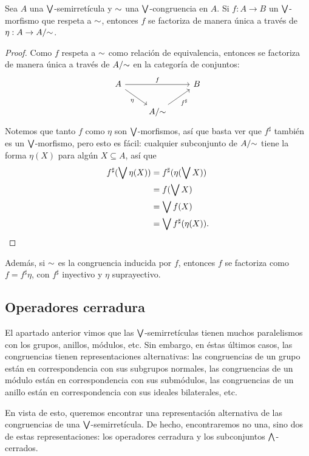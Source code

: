 \begin{proposition}
  Sea $A$ una $\bigvee$-semirretícula y ${\sim}$ una
  $\bigvee$-congruencia en $A$.
  Si $f:A\to B$ un $\bigvee$-morfismo que respeta a ${\sim}$,
  entonces $f$ se factoriza de manera única
  a través de $\eta:A\to A/{\sim}$.
\end{proposition}
\begin{proof}
  Como $f$ respeta a ${\sim}$ como relación de equivalencia,
  entonces se factoriza de manera única a través de $A/{\sim}$ en
  la categoría de conjuntos:
  \[
    \begin{tikzcd}
      A \ar[rr,"f"] \ar[dr,"\eta"'] & & B \\
      & A/\simr \ar[ur,"f^\sharp"']
    \end{tikzcd}
  \]
  Notemos que tanto $f$ como $\eta$ son $\bigvee$-morfismos, así
  que basta ver que $f^\sharp$ también es un $\bigvee$-morfismo,
  pero esto es fácil: cualquier subconjunto de $A/{\sim}$ tiene la
  forma $\eta(X)$ para algún $X\subseteq A$, así que
  \begin{align*}
    f^\sharp(\bigvee \eta(X))
    &= f^\sharp(\eta(\bigvee X)) \\
    &= f(\bigvee X) \\
    &= \bigvee f(X) \\
    &= \bigvee f^\sharp(\eta(X)).
  \end{align*}
\end{proof}
Además, si ${\sim}$ es la congruencia inducida por $f$,
entonces $f$ se factoriza como $f=f^\sharp\eta$, con $f^\sharp$
inyectivo y $\eta$ suprayectivo.

\subsection{Operadores cerradura}

El apartado anterior vimos que las $\bigvee$-semirretículas tienen
muchos paralelismos con los grupos, anillos, módulos, etc.
Sin embargo, en éstas últimos casos, las congruencias tienen
representaciones alternativas: las congruencias de un grupo están
en correspondencia con sus subgrupos normales,
las congruencias de un módulo están en correspondencia con sus
submódulos, las congruencias de un anillo están en
correspondencia con sus ideales bilaterales, etc.

En vista de esto, queremos encontrar una representación
alternativa de las congruencias de una $\bigvee$-semirretícula.
De hecho, encontraremos no una, sino dos de estas
representaciones: los operadores cerradura y los
subconjuntos $\bigwedge$-cerrados.


